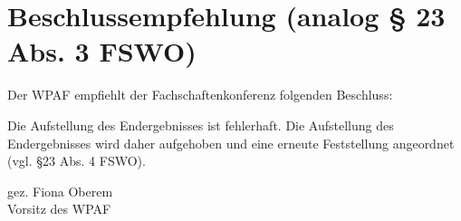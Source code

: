 \documentclass[a4paper]{scrartcl}
\newcommand{\vorsitz}{Fiona Oberem}
\begin{document}



\section*{Beschlussempfehlung (analog § 23 Abs. 3 FSWO)}

Der WPAF empfiehlt der Fachschaftenkonferenz folgenden Beschluss:

\vspace{1em}

Die Aufstellung des Endergebnisses ist fehlerhaft. Die Aufstellung des Endergebnisses wird daher aufgehoben und eine erneute Feststellung angeordnet (vgl. §23 Abs. 4 FSWO).


gez. \vorsitz\\
Vorsitz des WPAF
\end{document}
